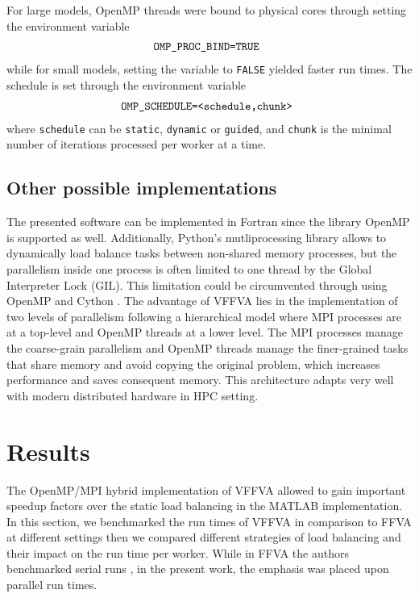 For large models, OpenMP threads were bound to physical cores through setting the environment variable 
\begin{equation*} \label{eq:one}
\begin{array}{ll@{}ll}
\texttt{OMP\_PROC\_BIND=TRUE} &\\
\end{array}
\end{equation*}
while for small models, setting the variable to \texttt{FALSE}  yielded faster run times.
The schedule is set through the environment variable
\begin{equation*} \label{eq:one}
\begin{array}{ll@{}ll}
\texttt{OMP\_SCHEDULE=<schedule,chunk>} &\\
\end{array}
\end{equation*}
where \texttt{schedule} can be \texttt{static}, \texttt{dynamic} or \texttt{guided}, and \texttt{chunk} is the minimal number of iterations processed per worker at a time.
\subsection*{Other possible implementations}
The presented software can be implemented in Fortran since the library OpenMP is supported as well. Additionally, Python's mutliprocessing library allows to dynamically load balance tasks between non-shared memory processes, but the parallelism inside one process is often limited to one thread by the Global Interpreter Lock (GIL). This limitation could be circumvented through using OpenMP and Cython \cite{behnel2011cython}. The advantage of VFFVA lies in the implementation of two levels of parallelism following a hierarchical model where MPI processes are at a top-level and OpenMP threads at a lower level. The MPI processes manage the coarse-grain parallelism and OpenMP threads manage the finer-grained tasks that share memory and avoid copying the original problem, which increases performance and saves consequent memory. This architecture adapts very well with modern distributed hardware in HPC setting.\\
\section*{Results}
The OpenMP/MPI hybrid implementation of VFFVA allowed to gain important speedup factors over the static load balancing in the MATLAB implementation. In this section, we benchmarked the run times of VFFVA in comparison to FFVA at different settings then we compared different strategies of load balancing and their impact on the run time per worker. While in FFVA the authors benchmarked serial runs \cite{gudmundsson2010computationally}, in the present work, the emphasis was placed upon parallel run times.
